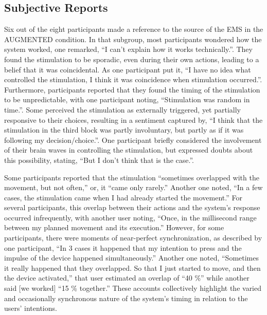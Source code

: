 \subsection{Subjective Reports}
Six out of the eight participants made a reference to the source of the EMS in the AUGMENTED condition. In that subgroup, most participants wondered how the system worked, one remarked, ``I can't explain how it works technically.''. They found the stimulation to be sporadic, even during their own actions, leading to a belief that it was coincidental. As one participant put it, ``I have no idea what controlled the stimulation, I think it was coincidence when stimulation occurred.''. Furthermore, participants reported that they found the timing of the stimulation to be unpredictable, with one participant noting, ``Stimulation was random in time.''. Some perceived the stimulation as externally triggered, yet partially responsive to their choices, resulting in a sentiment captured by, ``I think that the stimulation in the third block was partly involuntary, but partly as if it was following my decision/choice.''. One participant briefly considered the involvement of their brain waves in controlling the stimulation, but expressed doubts about this possibility, stating, ``But I don't think that is the case.''.

Some participants reported that the stimulation ``sometimes overlapped with the movement, but not often,'' or, it ``came only rarely.'' Another one noted, ``In a few cases, the stimulation came when I had already started the movement.'' For several participants, this overlap between their actions and the system's response occurred infrequently, with another user noting, ``Once, in the millisecond range between my planned movement and its execution.'' However, for some participants, there were moments of near-perfect synchronization, as described by one participant, ``In 3 cases it happened that my intention to press and the impulse of the device happened simultaneously.'' Another one noted, ``Sometimes it really happened that they overlapped. So that I just started to move, and then the device activated,'' that user estimated an overlap of ``40 \%'' while another said [we worked] ``15 \% together.'' These accounts collectively highlight the varied and occasionally synchronous nature of the system's timing in relation to the users' intentions.

